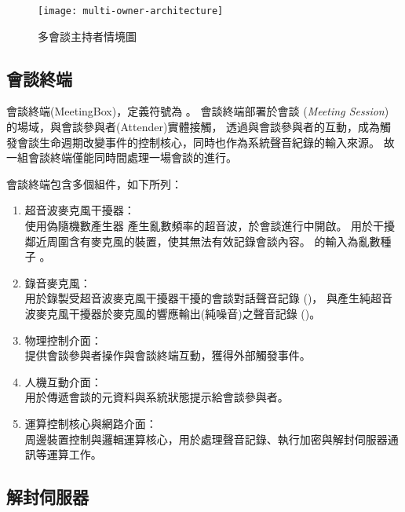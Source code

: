 \begin{figure}[H]
    \centering
    \texttt{[image: multi-owner-architecture]}
    \caption{多會談主持者情境圖}\label{fig:m-o-arch}
\end{figure}


\subsection{會談終端}

    會談終端(MeetingBox)，定義符號為 \DEFmeetingbox 。
會談終端部署於會談 ({\it Meeting Session}) 的場域，與會談參與者(Attender)實體接觸，
透過與會談參與者的互動，成為觸發會談生命週期改變事件的控制核心，同時也作為系統聲音紀錄的輸入來源。
故一組會談終端僅能同時間處理一場會談的進行。

    會談終端包含多個組件，如下所列：

    \begin{enumerate}
        \item 超音波麥克風干擾器：\\
            使用偽隨機數產生器 \DEFfuncPRNG{} 產生亂數頻率的超音波，於會談進行中開啟。
            用於干擾鄰近周圍含有麥克風的裝置，使其無法有效記錄會談內容。
            \DEFfuncPRNG{} 的輸入為亂數種子 \DEFseed。

        \item 錄音麥克風：\\
            用於錄製受超音波麥克風干擾器干擾的會談對話聲音記錄 (\DEFrecJ)，
            與產生純超音波麥克風干擾器於麥克風的響應輸出(純噪音)之聲音記錄 (\DEFrecN)。

        \item 物理控制介面：\\
            提供會談參與者操作與會談終端互動，獲得外部觸發事件。

        \item 人機互動介面：\\
            用於傳遞會談的元資料與系統狀態提示給會談參與者。

        \item 運算控制核心與網路介面：\\
            周邊裝置控制與邏輯運算核心，用於處理聲音記錄、執行加密與解封伺服器通訊等運算工作。
    \end{enumerate}


\subsection{解封伺服器}

